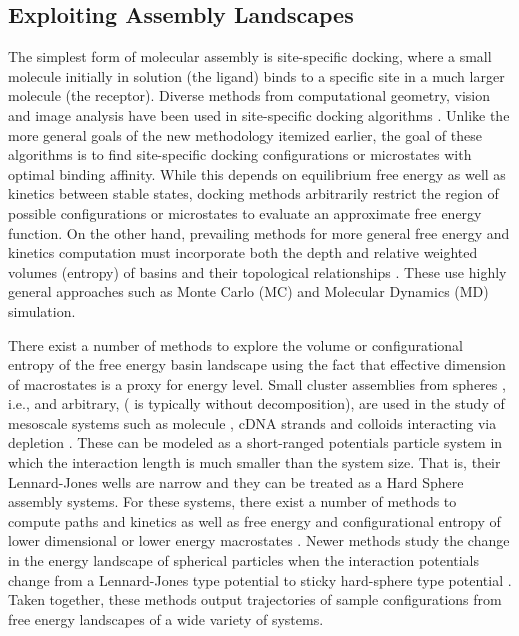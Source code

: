 \documentclass[]{article}
\begin{document}
\subsection{Exploiting Assembly Landscapes}
\label{sec:intro:ExploitingAssembly}
The simplest form of molecular assembly is site-specific docking, where a small
molecule initially in solution (the ligand) binds to a specific site in a much
larger molecule (the receptor). Diverse methods from computational geometry,
vision and image analysis have been used in site-specific docking algorithms
\cite{Bespamyatnikh, Choi2004, pmid1549581, Duhovny2002, pmid15980490,
Bolia2014, Bolia2016, Zhou2018}. Unlike the more general goals of the new
methodology itemized earlier, the goal of these algorithms is to find
site-specific docking configurations or microstates with optimal binding
affinity. While this depends on equilibrium free energy as well as kinetics
between stable states, docking methods arbitrarily restrict the region of
possible configurations or microstates to evaluate an approximate free energy
function. On the other hand, prevailing methods for more general free energy
and kinetics computation must incorporate both the depth and relative weighted
volumes (entropy) of basins and their topological relationships . These use
highly general approaches such as Monte Carlo (MC) and Molecular Dynamics (MD)
simulation.\cite{kaku, Head_Given_Gilson_1997, kurnikov1999harlem,
Andricioaei_Karplus_2001, Hnizdo_Darian_Fedorowicz_Demchuk_Li_Singh_2007,
Killian_Yundenfreund_Kravitz_Gilson_2007, Hnizdo_Tan_Killian_Gilson_2008,
Clark2009, Clark2009-Fragment, brooks2009charmm, Hensen_Lange_Grubmuller_2010,
GregoryS201199, King2012, Koppisetty2013, case2010amber, Jiang2019}

There exist a number of methods to explore the volume or configurational
entropy of the free energy basin landscape using the fact that effective
dimension of macrostates is a proxy for energy level. Small cluster assemblies
from spheres \cite{Arkus2009, Wales2010, Beltran-Villegas2011, Calvo2012,
Khan2012, Hoy2012, Hoy2014}, i.e.,  and  arbitrary, ( is typically
 without decomposition), are used in the study of mesoscale systems
such as  molecule \cite{Doye1996, Hagen1993}, cDNA strands
\cite{Meng2010} and colloids interacting via depletion \cite{Gazzillo2006}.
These can be modeled as a short-ranged potentials particle system in which the
interaction length is much smaller than the system size. That is, their
Lennard-Jones wells are narrow and they can be treated as a Hard Sphere
assembly systems. For these systems, there exist a number of methods to
compute paths and kinetics as well as free energy and configurational entropy
of lower dimensional or lower energy macrostates \cite{Holmes-Cerfon2013,
Arkus2009, Wales2010, Beltran-Villegas2011, Calvo2012, Khan2012, Hoy2012,
Hoy2014}. Newer methods study the change in the energy landscape of spherical
particles when the interaction potentials change from a Lennard-Jones type
potential to sticky hard-sphere type potential \cite{Wales-Sticky2018,
trubiano2019canyons}. Taken together, these methods output trajectories of
sample configurations from free energy landscapes of a wide variety of systems.
\end{document}
